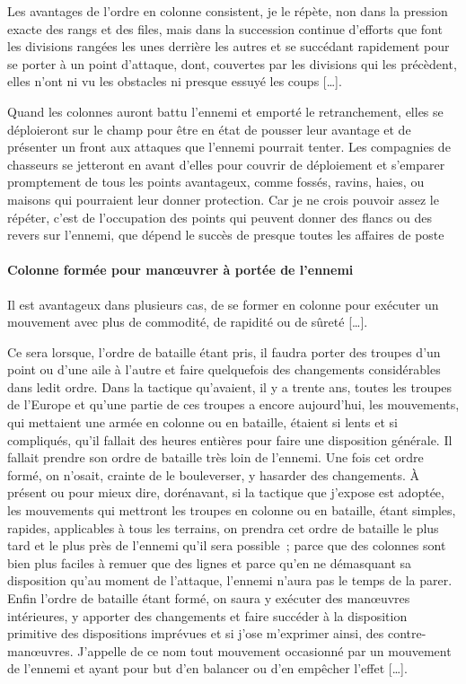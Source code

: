 \documentclass[french,twoside]{book} %
\begin{document}
Les avantages de l’ordre en colonne consistent, je le répète, non dans la pression exacte des rangs et des files, mais dans la succession continue d’efforts que font les divisions rangées les unes derrière les autres et se succédant rapidement pour se porter à un point d’attaque, dont, couvertes par les divisions qui les précèdent, elles n’ont ni vu les obstacles ni presque essuyé les coups […].\par
Quand les colonnes auront battu l’ennemi et emporté le retranchement, elles se déploieront sur le champ pour être en état de pousser leur avantage et de présenter un front aux attaques que l’ennemi pourrait tenter. Les compagnies de chasseurs se jetteront en avant d’elles pour couvrir de déploiement et s’emparer promptement de tous les points avantageux, comme fossés, ravins, haies, ou maisons qui pourraient leur donner protection. Car je ne crois pouvoir assez le répéter, c’est de l’occupation des points qui peuvent donner des flancs ou des revers sur l’ennemi, que dépend le succès de presque toutes les affaires de poste
\paragraph[{Colonne formée pour manœuvrer à portée de l’ennemi}]{Colonne formée pour manœuvrer à portée de l’ennemi}
\noindent Il est avantageux dans plusieurs cas, de se former en colonne pour exécuter un mouvement avec plus de commodité, de rapidité ou de sûreté […].\par
Ce sera lorsque, l’ordre de bataille étant pris, il faudra porter des troupes d’un point ou d’une aile à l’autre et faire quelquefois des changements considérables dans ledit ordre. Dans la tactique qu’avaient, il y a trente ans, toutes les troupes de l’Europe et qu’une partie de ces troupes a encore aujourd’hui, les mouvements, qui mettaient une armée en colonne ou en bataille, étaient si lents et si compliqués, qu’il fallait des heures entières pour faire une disposition générale. Il fallait prendre son ordre de bataille très loin de l’ennemi. Une fois cet ordre formé, on n’osait, crainte de le bouleverser, y hasarder des changements. À présent ou pour mieux dire, dorénavant, si la tactique que j’expose est adoptée, les mouvements qui mettront les troupes en colonne ou en bataille, étant simples, rapides, applicables à tous les terrains, on prendra cet ordre de bataille le plus tard et le plus près de l’ennemi qu’il sera possible ; parce que des colonnes sont bien plus faciles à remuer que des lignes et parce qu’en ne démasquant sa disposition qu’au moment de l’attaque, l’ennemi n’aura pas le temps de la parer. Enfin l’ordre de bataille étant formé, on saura y exécuter des manœuvres intérieures, y apporter des changements et faire succéder à la disposition primitive des dispositions imprévues et si j’ose m’exprimer ainsi, des contre-manœuvres. J’appelle de ce nom tout mouvement occasionné par un mouvement de l’ennemi et ayant pour but d’en balancer ou d’en empêcher l’effet […].
\end{document}
